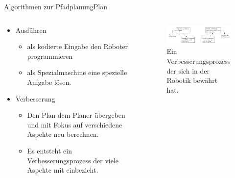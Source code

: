 \documentclass[t,aspectratio=169,dvipsnames]{beamer}
\begin{document}
\begin{frame}{Algorithmen zur Pfadplanung}{Plan}
	\begin{columns}
		\begin{column}[T]{0.5\textwidth}
			\begin{itemize}[<+->]
				\item Ausführen 
				\begin{itemize}
					\item als kodierte Eingabe den Roboter programmieren
					\item als Spezialmaschine eine spezielle Aufgabe lösen. 
				\end{itemize}
				\item Verbesserung
				\begin{itemize}
					\item Den Plan dem Planer übergeben und mit Fokus auf verschiedene Aspekte neu berechnen. 
					\item Es entsteht ein Verbesserungsprozess der viele Aspekte mit einbezieht.
				\end{itemize}
			\end{itemize}
		\end{column}
		\begin{column}[T]{0.5\textwidth}
			\begin{figure}
				\includegraphics[width=6.5cm]{images/img247.png}
				\caption{Ein Verbesserungsprozess der sich in der Robotik bewährt hat.} 
			\end{figure}
		\end{column}
	\end{columns}
\end{frame}
\end{document}
